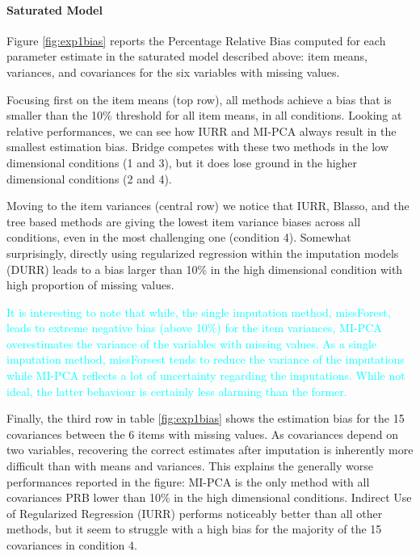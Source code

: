 	\paragraph{Saturated Model} Figure \ref{fig:exp1bias} reports the Percentage Relative Bias computed 
	for each parameter estimate in the saturated model described above: item means, variances, and covariances for
	the six variables with missing values.

	Focusing first on the item means (top row), all methods achieve a bias that is smaller than the 10\% threshold 
	for all item means, in all conditions.
	Looking at relative performances, we can see how IURR and MI-PCA always result in the smallest
	estimation bias. 
	Bridge competes with these two methods in the low dimensional conditions (1 and 3), but it 
	does lose ground in the higher dimensional conditions (2 and 4).

	Moving to the item variances (central row) we notice that IURR, Blasso, and the tree based methods are 
	giving the lowest item variance biases across all conditions, even in the most challenging one (condition 4).
	Somewhat surprisingly, directly using regularized regression within the imputation models (DURR) leads
	to a bias larger than 10\% in the high dimensional condition with high proportion of missing values.
	
\textcolor{cyan}{
	It is interesting to note that while, the single imputation method, missForest, leads to extreme negative bias 
	(above 10\%) for the item variances, MI-PCA overestimates the variance of the variables with missing values.
	As a single imputation method, missForsest tends to reduce the variance of the imputations while MI-PCA reflects
	a lot of uncertainty regarding the imputations.
	While not ideal, the latter behaviour is certainly less alarming than the former.
}
	
	Finally, the third row in table \ref{fig:exp1bias} shows the estimation bias for the 15 covariances between 
	the 6 items with missing values.
	As covariances depend on two variables, recovering the correct estimates after imputation is inherently 
	more difficult than with means and variances.
	This explains the generally worse performances reported in the figure: MI-PCA is the only method with
	all covariances PRB lower than 10\% in the high dimensional conditions.
	Indirect Use of Regularized Regression (IURR) performs noticeably better than all other methods, but it 
	seem to struggle with a high bias for the majority of the 15 covariances in condition 4.

